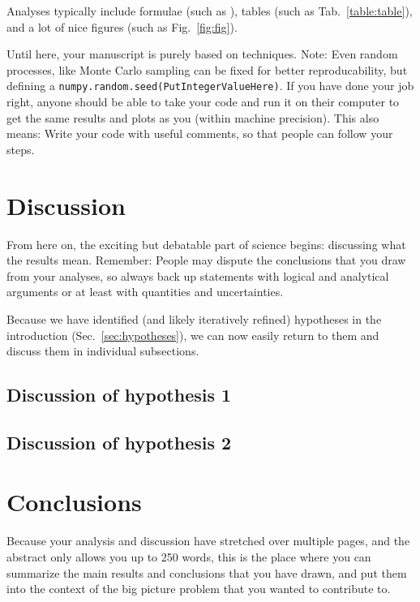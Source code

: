 \documentclass[twocolumn,apj,numberedappendix,appendixfloats]{openjournal}
\begin{document}
Analyses typically include formulae (such as ), tables (such as Tab.~\ref{table:table}), and a lot of nice figures (such as Fig.~\ref{fig:fig}).



Until here, your manuscript is purely based on techniques. Note: Even random processes, like Monte Carlo sampling can be fixed for better reproducability, but defining a \texttt{numpy.random.seed(PutIntegerValueHere)}. If you have done your job right, anyone should be able to take your code and run it on their computer to get the same results and plots as you (within machine precision). This also means: Write your code with useful comments, so that people can follow your steps.

\clearpage
\section{Discussion} \label{sec:discussion}

From here on, the exciting but debatable part of science begins: discussing what the results mean. Remember: People may dispute the conclusions that you draw from your analyses, so always back up statements with logical and analytical arguments or at least with quantities and uncertainties.

Because we have identified (and likely iteratively refined) hypotheses in the introduction (Sec.~\ref{sec:hypotheses}), we can now easily return to them and discuss them in individual subsections.

\subsection{Discussion of hypothesis 1}

\subsection{Discussion of hypothesis 2}

\clearpage
\section{Conclusions} \label{sec:conclusions}

Because your analysis and discussion have stretched over multiple pages, and the abstract only allows you up to 250 words, this is the place where you can summarize the main results and conclusions that you have drawn, and put them into the context of the big picture problem that you wanted to contribute to.
\end{document}
